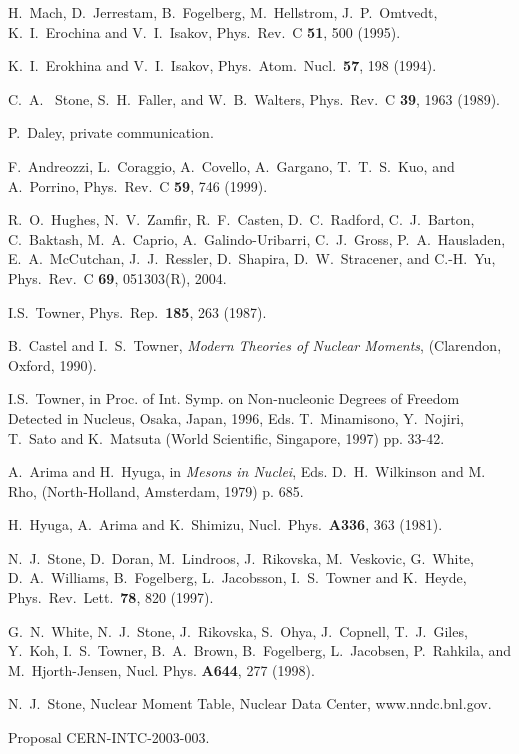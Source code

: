 \documentclass[aps,twocolumn,superscriptaddress,prc,showpacs]{revtex4}
\begin{document}
\begin{thebibliography}{9}
H.~Mach, D.~Jerrestam, B.~Fogelberg, M.~Hellstrom, J.~P.~Omtvedt,
K.~I.~Erochina and V.~I.~Isakov, Phys.~Rev.~C {\bf 51}, 500 (1995). 

K.~I.~Erokhina and V.~I.~Isakov, Phys.~Atom.~Nucl.~{\bf 57}, 198 (1994). 

C.~A.~ Stone, S.~H.~Faller, and W.~B.~Walters,
     Phys.~Rev.~C {\bf 39}, 1963 (1989).   

P.~Daley, private communication.

F.~Andreozzi, L.~Coraggio, A.~Covello, A.~Gargano,
     T.~T.~S.~Kuo, and A.~Porrino,  Phys.~Rev.~C {\bf 59}, 746 (1999).   

 R.~O.~Hughes, N.~V.~Zamfir, R.~F.~Casten, D.~C.~Radford, C.~J.~Barton,
C.~Baktash, M.~A.~Caprio, A.~Galindo-Uribarri, C.~J.~Gross, P.~A.~Hausladen, E.~A.~McCutchan,
J.~J.~Ressler, D.~Shapira, D.~W.~Stracener, and C.-H.~Yu,  Phys.~Rev.~C {\bf 69}, 051303(R), 2004.

I.S.~Towner, Phys.~Rep.~{\bf 185}, 263 (1987).  

     B.~Castel and I.~S.~Towner, {\em Modern Theories of Nuclear Moments},
     (Clarendon, Oxford, 1990).

     I.S.~Towner, in
     Proc. of Int. Symp. on Non-nucleonic Degrees of Freedom Detected
     in Nucleus, Osaka, Japan, 1996,
     Eds. T.~Minamisono, Y.~Nojiri, T.~Sato and K.~Matsuta (World
     Scientific, Singapore, 1997) pp. 33-42.

     A.~Arima and H.~Hyuga, in {\em Mesons in Nuclei},
Eds. D.~H.~Wilkinson and M.~ Rho, (North-Holland, Amsterdam, 1979) p. 685.

     H.~Hyuga, A.~Arima and K.~Shimizu, Nucl.~Phys.~{\bf A336}, 363 (1981).

     N.~J.~Stone, D.~Doran, M.~Lindroos, J.~Rikovska, M.~Veskovic,
     G.~White, D.~A.~Williams, B.~Fogelberg, L.~Jacobsson, I.~S.~Towner and
     K.~Heyde, Phys.~Rev.~Lett.~{\bf 78}, 820 (1997).    

 G.~N.~White, N.~J.~Stone, J.~Rikovska, S.~Ohya,
     J.~Copnell, T.~J.~Giles, Y.~Koh, I.~S.~Towner, B.~A.~Brown,
     B.~Fogelberg, L.~Jacobsen, P.~Rahkila, and M.~Hjorth-Jensen,
     Nucl. Phys. {\bf A644}, 277 (1998). 
   
N.~J.~Stone, Nuclear Moment Table, Nuclear Data Center, www.nndc.bnl.gov.

 Proposal CERN-INTC-2003-003.
\end{thebibliography}
\end{document}
